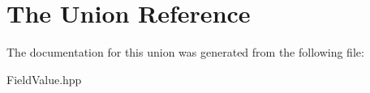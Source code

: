 \hypertarget{unionThe}{}\section{The Union Reference}
\label{unionThe}


The documentation for this union was generated from the following file\+:\begin{DoxyCompactItemize}
\item 
Field\+Value.\+hpp\end{DoxyCompactItemize}
